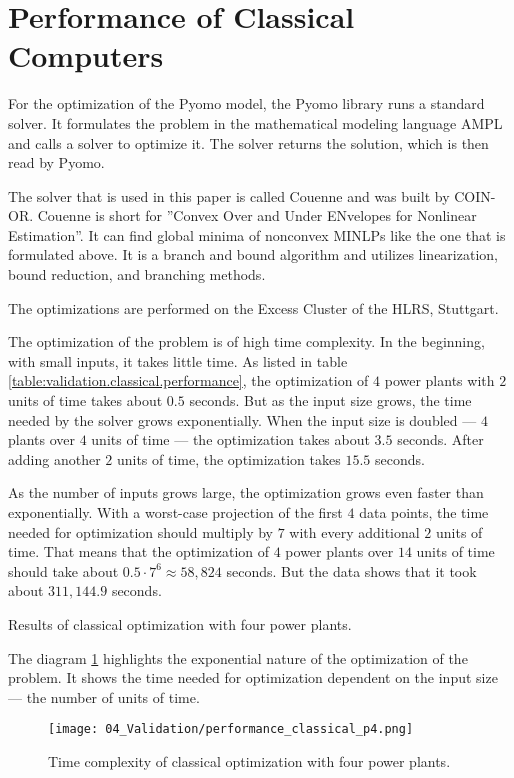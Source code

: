 \section{Performance of Classical Computers}

For the optimization of the Pyomo model, the Pyomo library runs a standard solver.
It formulates the problem in the mathematical modeling language AMPL
and calls a solver to optimize it.
The solver returns the solution, which is then read by Pyomo.
\cite{PyomoAMPL}

The solver that is used in this paper is called Couenne and was built by COIN-OR.
Couenne is short for ''Convex Over and Under ENvelopes for Nonlinear Estimation''.
It can find global minima of nonconvex MINLPs like the one that is formulated above.
It is a branch and bound algorithm and utilizes linearization, bound reduction, and branching methods.
\cite{Belotti2009,CoinorHome,CouenneRepo}

The optimizations are performed on the Excess Cluster of the HLRS, Stuttgart.
\cite{ExcessHLRS,HLRS}

The optimization of the problem is of high time complexity.
In the beginning, with small inputs, it takes little time.
As listed in table \ref{table:validation.classical.performance}, the optimization of $4$ power plants with $2$ units of time takes about $0.5$ seconds.
But as the input size grows, the time needed by the solver grows exponentially.
When the input size is doubled --- $4$ plants over $4$ units of time --- the optimization takes about $3.5$ seconds.
After adding another $2$ units of time, the optimization takes $15.5$ seconds.

As the number of inputs grows large, the optimization grows even faster than exponentially.
With a worst-case projection of the first $4$ data points, the time needed for optimization should multiply by $7$ with every additional $2$ units of time.
That means that the optimization of $4$ power plants over $14$ units of time should take about $0.5 \cdot 7^6 \approx 58,824$ seconds.
But the data shows that it took about $311,144.9$ seconds.

\begin{table}[ht]
  \centering
  
  \caption{Results of classical optimization with four power plants.}
  \label{table:validation.classical.performance}
\end{table}

The diagram \ref{figure:validation.classical.performance} highlights the exponential nature of the optimization of the problem.
It shows the time needed for optimization dependent on the input size --- the number of units of time.

\begin{figure}[ht]
  \centering
  \texttt{[image: 04\_Validation/performance\_classical\_p4.png]}
  \caption{Time complexity of classical optimization with four power plants.}
  \label{figure:validation.classical.performance}
\end{figure}
